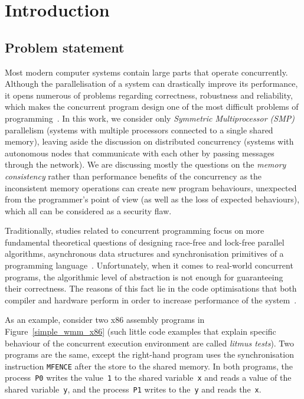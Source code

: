 \chapter{Introduction}
\label{ch:intro}


\section{Problem statement}
\label{ch:intro:problem}

Most modern computer systems contain large parts that operate concurrently.
Although the parallelisation of a system can drastically improve its performance, it opens numerous of problems regarding correctness, robustness and reliability, which makes the concurrent program design one of the most difficult problems of programming~\cite{mckenney2017parallel}.
In this work, we consider only \textit{Symmetric Multiprocessor (SMP)} parallelism (systems with multiple processors connected to a single shared memory), leaving aside the discussion on distributed concurrency (systems with autonomous nodes that communicate with each other by passing messages through the network).
We are discussing mostly the questions on the \textit{memory consistency} rather than performance benefits of the concurrency as the inconsistent memory operations can create new program behaviours, unexpected from the programmer's point of view (as well as the loss of expected behaviours), which all can be considered as a security flaw.

Traditionally, studies related to concurrent programming focus on more fundamental theoretical questions of designing race-free and lock-free parallel algorithms, asynchronous data structures and synchronisation primitives of a programming language~\cite{ben2006principles}.
Unfortunately, when it comes to real-world concurrent programs, the algorithmic level of abstraction is not enough for guaranteeing their correctness.
The reasons of this fact lie in the code optimisations that both compiler and hardware perform in order to increase performance of the system~\cite{adve1996shared}.

As an example, consider two x86 assembly programs in Figure~\ref{simple_wmm_x86} (such little code examples that explain specific behaviour of the concurrent execution environment are called \textit{litmus tests}).
Two programs are the same, except the right-hand program uses the synchronisation instruction \texttt{MFENCE} after the store to the shared memory.
In both programs, the process~\texttt{P0} writes the value~\texttt{1} to the shared variable~\texttt{x} and reads a value of the shared variable~\texttt{y}, and the process~\texttt{P1} writes to the~\texttt{y} and reads the~\texttt{x}.

